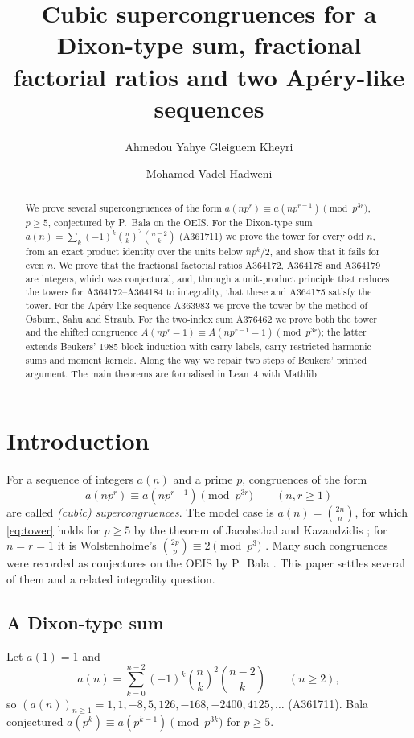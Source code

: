 \documentclass[11pt]{amsart}
\title[Supercongruences for a Dixon-type sum, factorial ratios and Ap\'ery-like sequences]{Cubic supercongruences for a Dixon-type sum, fractional factorial ratios and two Ap\'ery-like sequences}
\author{Ahmedou Yahye Gleiguem Kheyri}
\author{Mohamed Vadel Hadweni}
\begin{document}
\begin{abstract}
We prove several supercongruences of the form $a(np^r)\equiv a(np^{r-1})\pmod{p^{3r}}$, $p\ge5$, conjectured by P.~Bala on the OEIS. For the Dixon-type sum $a(n)=\sum_k(-1)^k\binom nk^2\binom{n-2}{k}$ (A361711) we prove the tower for every odd $n$, from an exact product identity over the units below $np^k/2$, and show that it fails for even $n$. We prove that the fractional factorial ratios A364172, A364178 and A364179 are integers, which was conjectural, and, through a unit-product principle that reduces the towers for A364172--A364184 to integrality, that these and A364175 satisfy the tower. For the Ap\'ery-like sequence A363983 we prove the tower by the method of Osburn, Sahu and Straub. For the two-index sum A376462 we prove both the tower and the shifted congruence $A(np^r-1)\equiv A(np^{r-1}-1)\pmod{p^{3r}}$; the latter extends Beukers' 1985 block induction with carry labels, carry-restricted harmonic sums and moment kernels. Along the way we repair two steps of Beukers' printed argument. The main theorems are formalised in Lean~4 with Mathlib.
\end{abstract}
\maketitle

\section{Introduction}

For a sequence of integers $a(n)$ and a prime $p$, congruences of the form
\begin{equation}\label{eq:tower}
a(np^r)\equiv a(np^{r-1})\pmod{p^{3r}}\qquad(n,r\ge1)
\end{equation}
are called \emph{(cubic) supercongruences}. The model case is $a(n)=\binom{2n}{n}$, for which \eqref{eq:tower} holds for $p\ge5$ by the theorem of Jacobsthal and Kazandzidis \cite{jacobsthal1952,kazandzidis1968,robertzuber1995}; for $n=r=1$ it is Wolstenholme's $\binom{2p}{p}\equiv2\pmod{p^3}$ \cite{wolstenholme1862}. Many such congruences were recorded as conjectures on the OEIS \cite{oeis} by P.~Bala \cite{bala}. This paper settles several of them and a related integrality question.

\subsection*{A Dixon-type sum} Let $a(1)=1$ and
\[ a(n)=\sum_{k=0}^{n-2}(-1)^k\binom nk^2\binom{n-2}{k}\qquad(n\ge2), \]
so $(a(n))_{n\ge1}=1,1,-8,5,126,-168,-2400,4125,\dots$ (A361711). Bala conjectured $a(p^k)\equiv a(p^{k-1})\pmod{p^{3k}}$ for $p\ge5$.
\end{document}
